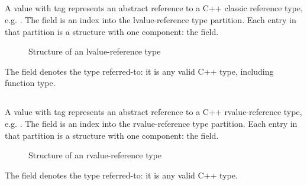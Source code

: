 

\subsection{}
\label{sec:ifc:TypeSort:LvalueReference}

A  value with tag  represents
an abstract reference to a C++ classic reference type, e.g. .
The  field is an index into the lvalue-reference type partition.
Each entry in that partition is a structure with one component: the  field.
%
\begin{figure}[H]
	\centering
	\caption{Structure of an lvalue-reference type}
	\label{fig:ifc-lvalue-reference-type-structure}
\end{figure}
%
The  field denotes the type referred-to: it is any valid C++ type,
including function type.



\subsection{}
\label{sec:ifc:TypeSort:RvalueReference}

A  value with tag  represents
an abstract reference to a C++ rvalue-reference type, e.g. .
The  field is an index into the rvalue-reference type partition.
Each entry in that partition is a structure with one component: the  field.
%
\begin{figure}[H]
	\centering
	\caption{Structure of an rvalue-reference type}
	\label{fig:ifc-rvalue-reference-type-structure}
\end{figure}
%
The  field denotes the type referred-to: it is any valid C++ type.


\subsection{}
\label{sec:ifc:TypeSort:Function}

